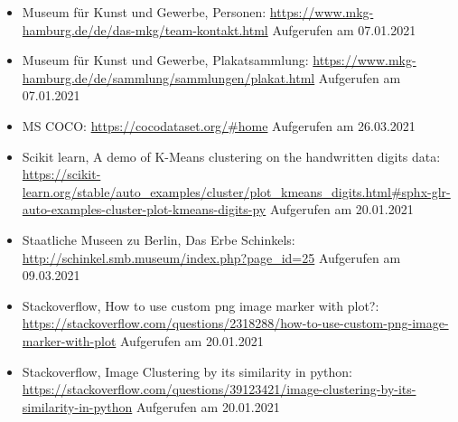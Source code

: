 \documentclass[a4paper,12pt,ngerman]{article}
\begin{document}
\begin{itemize}
\item Museum für Kunst und Gewerbe, Personen: \newline \href{https://www.mkg-hamburg.de/de/das-mkg/team-kontakt.html}{https://www.mkg-hamburg.de/de/das-mkg/team-kontakt.html} \newline Aufgerufen am 07.01.2021
\item Museum für Kunst und Gewerbe, Plakatsammlung: \newline \href{https://www.mkg-hamburg.de/de/sammlung/sammlungen/plakat.html}{https://www.mkg-hamburg.de/de/sammlung/sammlungen/plakat.html} \newline Aufgerufen am 07.01.2021
\item MS COCO: \newline \href{https://cocodataset.org/\#home}{https://cocodataset.org/\#home} \newline Aufgerufen am 26.03.2021
\item Scikit learn, A demo of K-Means clustering on the handwritten digits data: \newline \href{https://scikit-learn.org/stable/auto\_examples/cluster/plot\_kmeans\_digits.html\#sphx-glr-auto-examples-cluster-plot-kmeans-digits-py}{https://scikit-learn.org/stable/auto\_examples/cluster/plot\_kmeans\_digits.html\#sphx-glr-auto-examples-cluster-plot-kmeans-digits-py} \newline Aufgerufen am 20.01.2021
\item Staatliche Museen zu Berlin, Das Erbe Schinkels: \newline \href{http://schinkel.smb.museum/index.php?page_id=25}{http://schinkel.smb.museum/index.php?page\_id=25} \newline Aufgerufen am 09.03.2021
\item Stackoverflow, How to use custom png image marker with plot?: \newline \href{https://stackoverflow.com/questions/2318288/how-to-use-custom-png-image-marker-with-plot}{https://stackoverflow.com/questions/2318288/how-to-use-custom-png-image-marker-with-plot} \newline Aufgerufen am 20.01.2021
\item Stackoverflow, Image Clustering by its similarity in python: \newline \href{https://stackoverflow.com/questions/39123421/image-clustering-by-its-similarity-in-python}{https://stackoverflow.com/questions/39123421/image-clustering-by-its-similarity-in-python} \newline Aufgerufen am 20.01.2021

\end{itemize}
\end{document}
